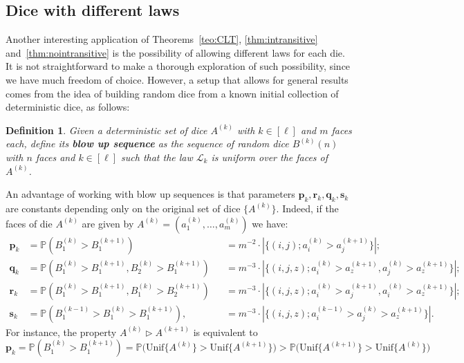 \documentclass[reqno,a4paper,11pt]{amsart}
\newcommand{\btt}{\triangleright}
\newtheorem{definition}[lemma]{Definition}
\theoremstyle{remark}
\newcommand{\mc}[1]{{\mathcal #1}}
\newcommand{\mb}[1]{{\mathbf #1}}
\newcommand{\bb}[1]{{\mathbb #1}}
\numberwithin{equation}{section}
\begin{document}
\subsection{Dice with different laws}
\label{sub:dice_with_different_laws}\hfill 

Another interesting application of Theorems~\ref{teo:CLT},
\ref{thm:intransitive} and~\ref{thm:nointransitive} is the possibility of
allowing different laws for each die. It is not straightforward to make a
thorough exploration of such possibility, since we have much freedom of choice.
However, a setup that allows for general results comes from the idea of
building random dice from a known initial collection of deterministic dice, as
follows:
\begin{definition}
\label{defi:blowupseq}
Given a deterministic set of dice $A^{(k)}$ with $k \in [\ell]$ and $m$ faces
each, define its \textbf{blow up sequence} as the sequence of random
dice $B^{(k)}(n)$ with $n$ faces and $k \in [\ell]$ such that 
the law $\mc L_k$ is uniform over the faces of $A^{(k)}$.
\end{definition}
An advantage of working with blow up sequences is that parameters $\mb p_k, \mb
r_k, \mb q_k, \mb s_k$ are constants depending only on the original set of dice
$\{A^{(k)}\}$. Indeed, if the faces of die $A^{(k)}$ are given by $A^{(k)} = (a^{(k)}_1, \ldots, a^{(k)}_{m})$ we have:
\begin{equation}
    \label{eq:blowup_coefficients}
    \begin{aligned}
    \mb p_k
        &= \mathbb P(B_1^{(k)} > B_1^{(k+1)})
        &&= m^{-2} \cdot |\{(i,j); a_i^{(k)} > a_j^{(k+1)}\}|;\\
    \mb q_k
        &= \mathbb P(B_1^{(k)} > B_1^{(k+1)}, B_2^{(k)} > B_1^{(k+1)})
        &&= m^{-3} \cdot |\{(i,j,z); a_i^{(k)} > a_z^{(k+1)}, a_j^{(k)} >
        a_z^{(k+1)}\}|;\\
    \mb r_k
        &= \mathbb P(B_1^{(k)} > B_1^{(k+1)}, B_1^{(k)} > B_2^{(k+1)})
        &&= m^{-3} \cdot |\{(i,j,z); a_i^{(k)} > a_j^{(k+1)}, a_i^{(k)} >
        a_z^{(k+1)}\}|;\\
    \mb s_k
        &= \bb P(B^{(k-1)}_1 > B^{(k)}_1 > B^{(k+1)}_1),
        &&= m^{-3} \cdot |\{(i,j,z); a_i^{(k-1)} > a_j^{(k)} > a_z^{(k+1)}\}|.
    \end{aligned}
\end{equation}
For instance, the property $A^{(k)} \btt A^{(k+1)}$ is equivalent to 
\begin{equation*}
\mb p_k
    = \mathbb P(B_1^{(k)} > B_1^{(k+1)})
    = \mathbb P\bigl(\text{Unif}\{A^{(k)}\} > \text{Unif}\{A^{(k+1)}\}\bigr)
    > \mathbb P\bigl(\text{Unif}\{A^{(k+1)}\} > \text{Unif}\{A^{(k)}\}\bigr)
\end{equation*}
\end{document}
